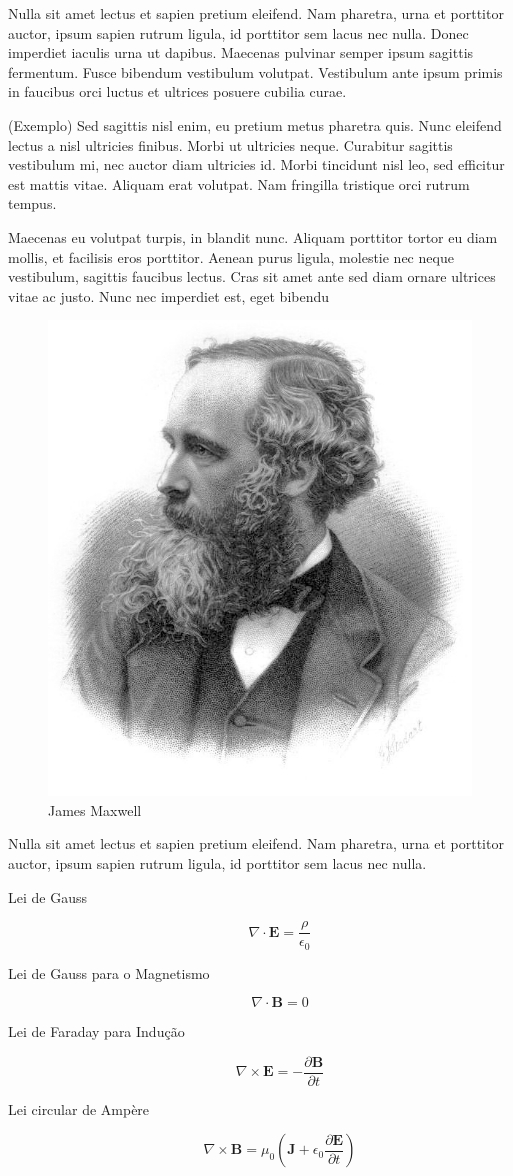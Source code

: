 Nulla sit amet lectus et sapien pretium eleifend. Nam pharetra, urna et porttitor auctor, ipsum sapien rutrum ligula, id porttitor sem lacus nec nulla. Donec imperdiet iaculis urna ut dapibus. Maecenas pulvinar semper ipsum sagittis fermentum. Fusce bibendum vestibulum volutpat. Vestibulum ante ipsum primis in faucibus orci luctus et ultrices posuere cubilia curae.

\begin{defi}
(Exemplo) Sed sagittis nisl enim, eu pretium metus pharetra quis. Nunc eleifend lectus a nisl ultricies finibus. Morbi ut ultricies neque. Curabitur sagittis vestibulum mi, nec auctor diam ultricies id. Morbi tincidunt nisl leo, sed efficitur est mattis vitae. Aliquam erat volutpat. Nam fringilla tristique orci rutrum tempus. 
\end{defi}

Maecenas eu volutpat turpis, in blandit nunc. Aliquam porttitor tortor eu diam mollis, et facilisis eros porttitor. Aenean purus ligula, molestie nec neque vestibulum, sagittis faucibus lectus. Cras sit amet ante sed diam ornare ultrices vitae ac justo. Nunc nec imperdiet est, eget bibendu

\begin{figure}[!htb]
    \centering
    \includegraphics[width=0.3\linewidth]{James_Clerk_Maxwell_big.jpg}
    \caption{James Maxwell}
    \label{fig:maxwell}
\end{figure}

\newpage

Nulla sit amet lectus et sapien pretium eleifend. Nam pharetra, urna et porttitor auctor, ipsum sapien rutrum ligula, id porttitor sem lacus nec nulla. 

\begin{description}
    \item[Lei de Gauss]
    $$\nabla \cdot \textbf{E} = \frac{\rho}{\epsilon_{0}}$$
    
    \item[Lei de Gauss para o Magnetismo]
    $$\nabla \cdot \textbf{B} = 0$$
    
    \item[Lei de Faraday para Indução]
    $$\nabla \times \textbf{E} = -\frac{\partial \textbf{B}}{\partial t}$$
    
    \item[Lei circular de Ampère]
    $$\nabla \times \textbf{B} = \mu_{0}\left(\textbf{J} + \epsilon_{0}\frac{\partial \textbf{E}}{\partial t} \right)$$
\end{description}

\newpage